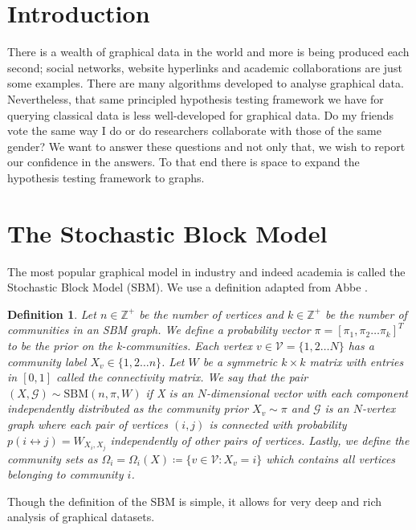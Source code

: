 \documentclass[11pt]{article}
\newcommand{\Gcal}{\mathcal{G}}
\newcommand{\Vcal}{\mathcal{V}}
\newcommand{\Integers}{\mathbb{Z}}
\newtheorem{definition}{Definition}[section]
\begin{document}
\begin{multicols*}{2}

\section{Introduction}

There is a wealth of graphical data in the world and more is being produced each second; social networks, website hyperlinks and academic collaborations are just some examples. There are many algorithms developed to analyse graphical data. Nevertheless, that same principled hypothesis testing framework we have for querying classical data is less well-developed for graphical data. Do my friends vote the same way I do or do researchers collaborate with those of the same gender? We want to answer these questions and not only that, we wish to report our confidence in the answers. To that end there is space to expand the hypothesis testing framework to graphs.

\section{The Stochastic Block Model}

The most popular graphical model in industry and indeed academia is called the Stochastic Block Model (SBM). We use a definition adapted from Abbe \cite{Abbe}.

\begin{definition}
	\label{defn:sbm}
	Let $n \in \Integers^+$ be the number of vertices and $k \in \Integers^+$ be the number of communities in an SBM graph. We define a probability vector $\pi = [\pi_1, \pi_2 \dots \pi_k]^T$ to be the prior on the k-communities. Each vertex $v \in \Vcal = \{1, 2 \dots N\}$ has a community label $X_v \in \{1, 2 \dots n\}$. Let $W$ be a symmetric $k \times k$ matrix with entries in $[0,1]$ called the connectivity matrix. We say that the pair $(X, \Gcal) \sim \textrm{SBM}(n, \pi, W)$ if X is an $N$-dimensional vector with each component independently distributed as the community prior $X_v \sim \pi$ and $\Gcal$ is an $N$-vertex graph where each pair of vertices $(i, j)$ is connected with probability $p(i \leftrightarrow j) = W_{X_i, X_j}$ independently of other pairs of vertices. Lastly, we define the community sets as $\Omega_i = \Omega_i(X) \coloneqq \{v \in \Vcal : X_v = i\}$ which contains all vertices belonging to community $i$.
\end{definition}

Though the definition of the SBM is simple, it allows for very deep and rich analysis of graphical datasets.


\end{multicols*}
\end{document}
